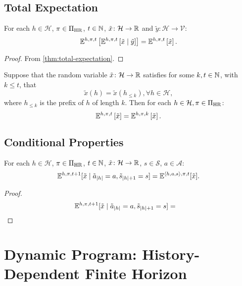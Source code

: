 \subsection{Total Expectation}

\begin{theorem} \label{thm:total-expectation-h}
  For each $h\in \mathcal{H}$, $\pi\in \Pi_{\mathrm{HR}}$, $t\in \mathbb{N}$, $\tilde{x}\colon \mathcal{H} \to \mathbb{R}$ and $\tilde{y}\colon \mathcal{H} \to \mathcal{V}$:
  \[
    \mathbb{E}^{h, \pi, t} \left[ \mathbb{E}^{h, \pi, t} \left[  \tilde{x} \mid  \tilde{y} \right] \right]
    =
    \mathbb{E}^{h, \pi, t} \left[ \tilde{x} \right].
  \]
\end{theorem}
\begin{proof}
From \cref{thm:total-expectation}.
\end{proof}

\begin{theorem}\label{thm:exp-horizon-cut}
Suppose that the random variable $\tilde{x}\colon \mathcal{H} \to \mathbb{R}$ satisfies for some $k, t \in \mathbb{N}$, with $k \le t$, that
  \[
   \tilde{x}(h) = \tilde{x}(h_{\le k}) , \forall h\in  \mathcal{H},
 \]
 where $h_{\le k}$ is the prefix of $h$ of length $k$. Then for each $h\in \mathcal{H}, \pi\in \Pi_{\mathrm{HR}}$:
 \[
  \mathbb{E}^{h,\pi,t} \left[ \tilde{x} \right]  = \mathbb{E}^{h,\pi,k} \left[  \tilde{x} \right].
 \]
\end{theorem}


\subsection{Conditional Properties}

\begin{theorem} \label{thm:exph-cond-eq-hist}
For each $h\in \mathcal{H}$, $\pi\in \Pi_{\mathrm{HR}}$, $t\in \mathbb{N}$, $\tilde{x}\colon \mathcal{H} \to \mathbb{R}$, $s\in \mathcal{S}$, $a\in \mathcal{A}$:
\[
  \mathbb{E}^{h,\pi,t+1}[\tilde{x} \mid \tilde{a}_{|h|} = a, \tilde{s}_{|h|+1} = s]
  =
  \mathbb{E}^{\langle h, a, s\rangle,\pi,t}[\tilde{x}].
\]
\end{theorem}
\begin{proof}
\begin{align*}
  \mathbb{E}^{h,\pi,t+1}[\tilde{x} \mid \tilde{a}_{|h|} = a, \tilde{s}_{|h|+1} = s]
  &= 
\end{align*}
\end{proof}

\section{Dynamic Program: History-Dependent Finite Horizon}

